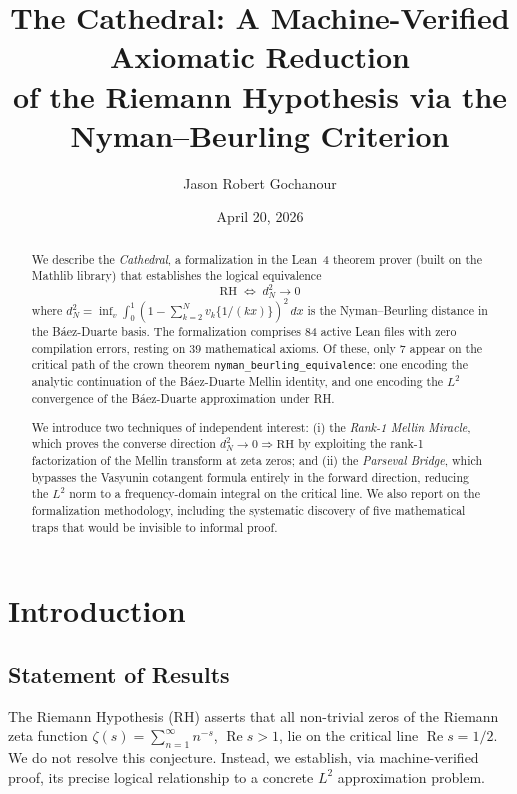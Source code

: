 \documentclass[11pt,a4paper]{article}
\title{%
  The Cathedral: A Machine-Verified Axiomatic Reduction\\
  of the Riemann Hypothesis via the Nyman--Beurling Criterion%
}
\author{
  Jason Robert Gochanour
}
\date{April 20, 2026}
\theoremstyle{plain}
\theoremstyle{definition}
\theoremstyle{remark}
\newcommand{\RH}{\mathrm{RH}}
\newcommand{\re}{\operatorname{Re}}
\newcommand{\fract}[1]{\{#1\}}
\newcommand{\lean}[1]{\texttt{#1}}
\begin{document}
\maketitle

\begin{abstract}
We describe the \emph{Cathedral}, a formalization in the Lean~4 theorem
prover (built on the Mathlib library) that establishes the logical
equivalence
\[
  \RH \;\iff\; d_N^2 \to 0
\]
where $d_N^2 = \inf_{v} \int_0^1 (1 - \sum_{k=2}^N v_k \fract{1/(kx)})^2\,dx$
is the Nyman--Beurling distance in the B\'aez-Duarte basis. The
formalization comprises 84 active Lean files with zero compilation errors,
resting on 39 mathematical axioms. Of these, only 7 appear on the critical
path of the crown theorem \lean{nyman\_beurling\_equivalence}: one
encoding the analytic continuation of the B\'aez-Duarte Mellin identity,
and one encoding the $L^2$ convergence of the B\'aez-Duarte approximation
under RH.

We introduce two techniques of independent interest: (i) the
\emph{Rank-1 Mellin Miracle}, which proves the converse direction
$d_N^2 \to 0 \Rightarrow \RH$ by exploiting the rank-1 factorization
of the Mellin transform at zeta zeros; and (ii) the \emph{Parseval Bridge},
which bypasses the Vasyunin cotangent formula entirely in the forward
direction, reducing the $L^2$ norm to a frequency-domain integral on the
critical line. We also report on the formalization methodology,
including the systematic discovery of five mathematical traps that
would be invisible to informal proof.
\end{abstract}

\tableofcontents

\section{Introduction}

\subsection{Statement of Results}

The Riemann Hypothesis (RH) asserts that all non-trivial zeros of the
Riemann zeta function $\zeta(s) = \sum_{n=1}^\infty n^{-s}$, $\re s > 1$,
lie on the critical line $\re s = 1/2$. We do not resolve this
conjecture. Instead, we establish, via machine-verified proof, its
precise logical relationship to a concrete $L^2$ approximation problem.
\end{document}
